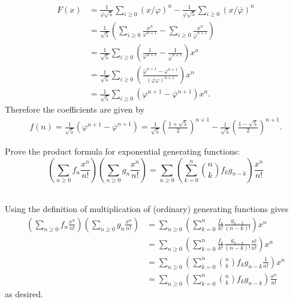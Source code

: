 \documentclass{article}
\newenvironment{problem}[2][Problem]{\begin{trivlist}
\item[\hskip \labelsep {\bfseries #1}\hskip \labelsep {\bfseries #2.}]}{\end{trivlist}}
\newenvironment{solution}[1][Solution.]{\begin{trivlist}
\item[\hskip \labelsep {\bfseries #1}]}{\end{trivlist}}
\begin{document}
\begin{solution}
\begin{enumerate}[(a)]
\begin{align*}
      F(x) &= \frac{1}{\varphi\sqrt{5}}\sum_{i\geq0}(x/\varphi)^n
      - \frac{1}{\overline\varphi\sqrt{5}}\sum_{i\geq0}(x/\overline\varphi)^n \\
      &= \frac{1}{\sqrt{5}}\left(
        \sum_{i\geq0}\frac{x^n}{\varphi^{n+1}}
        - \sum_{i\geq0}\frac{x^n}{\overline\varphi^{n+1}}
      \right) \\
      &= \frac{1}{\sqrt{5}}
        \sum_{i\geq0}\left(\frac{1}{\varphi^{n+1}} - \frac{1}{\overline\varphi^{n+1}}
      \right)x^n \\
      &= \frac{1}{\sqrt{5}}
        \sum_{i\geq0}\left(\frac{\overline\varphi^{n+1} - \varphi^{n+1}}{(\overline\varphi\varphi)^{n+1}}
      \right)x^n \\
      &= \frac{1}{\sqrt{5}}
        \sum_{i\geq0}\left(\varphi^{n+1} - \overline\varphi^{n+1}
      \right)x^n.
    \end{align*} Therefore the coefficients are given by \begin{align*}
      f(n)
      = \frac{1}{\sqrt{5}}(\varphi^{n+1} - \overline\varphi^{n+1})
      = \frac{1}{\sqrt{5}}\left(\frac{1 + \sqrt 5}{2}\right)^{n+1}
      - \frac{1}{\sqrt{5}}\left(\frac{1 - \sqrt 5}{2}\right)^{n+1}.
    \end{align*}
  \end{enumerate}
\end{solution}
\pagebreak
\begin{problem}{2} Prove the product formula for exponential generating
  functions: \[
    \left(\sum_{n\geq0} f_n\frac{x^n}{n!}\right)
    \left(\sum_{n\geq0} g_n\frac{x^n}{n!}\right)
    = \sum_{n\geq0} \left(
      \sum_{k=0}^n \binom nk f_kg_{n-k}
    \right)\frac{x^n}{n!}
  \]
\end{problem}
\begin{solution} \text{} \\
  Using the definition of multiplication of (ordinary) generating functions
  gives \begin{align*}
    \left(\sum_{n\geq0} f_n\frac{x^n}{n!}\right)
    \left(\sum_{n\geq0} g_n\frac{x^n}{n!}\right)
    &= \sum_{n\geq0} \left(
      \sum_{k=0}^n \frac{f_k}{k!}\frac{g_{n-k}}{(n-k)!}
    \right)\!x^n \\
    &= \sum_{n\geq0} \left(
      \sum_{k=0}^n \frac{f_k}{k!}\frac{g_{n-k}}{(n-k)!}\frac{n!}{n!}
    \right)\!x^n \\
    &= \sum_{n\geq0} \left(
      \sum_{k=0}^n \binom nk f_k g_{n-k}\frac{1}{n!}
    \right)\!x^n \\
    &= \sum_{n\geq0} \left(
      \sum_{k=0}^n \binom nk f_kg_{n-k}
    \right)\frac{x^n}{n!}
  \end{align*} as desired.
\end{solution}
\end{document}
